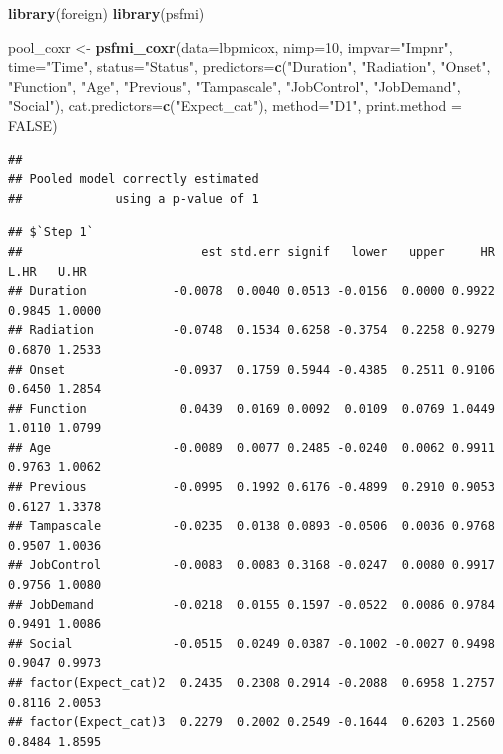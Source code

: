 \documentclass[
]{book}
\newenvironment{Shaded}{\begin{snugshade}}{\end{snugshade}}
\newcommand{\DataTypeTok}[1]{\textcolor[rgb]{0.13,0.29,0.53}{#1}}
\newcommand{\DecValTok}[1]{\textcolor[rgb]{0.00,0.00,0.81}{#1}}
\newcommand{\KeywordTok}[1]{\textcolor[rgb]{0.13,0.29,0.53}{\textbf{#1}}}
\newcommand{\NormalTok}[1]{#1}
\newcommand{\OperatorTok}[1]{\textcolor[rgb]{0.81,0.36,0.00}{\textbf{#1}}}
\newcommand{\OtherTok}[1]{\textcolor[rgb]{0.56,0.35,0.01}{#1}}
\newcommand{\StringTok}[1]{\textcolor[rgb]{0.31,0.60,0.02}{#1}}
\begin{document}
\begin{Shaded}
\begin{Highlighting}[]
\KeywordTok{library}\NormalTok{(foreign)}
\KeywordTok{library}\NormalTok{(psfmi)}

\NormalTok{pool_coxr <-}\StringTok{ }\KeywordTok{psfmi_coxr}\NormalTok{(}\DataTypeTok{data=}\NormalTok{lbpmicox, }\DataTypeTok{nimp=}\DecValTok{10}\NormalTok{, }\DataTypeTok{impvar=}\StringTok{"Impnr"}\NormalTok{, }\DataTypeTok{time=}\StringTok{"Time"}\NormalTok{, }\DataTypeTok{status=}\StringTok{"Status"}\NormalTok{,}
  \DataTypeTok{predictors=}\KeywordTok{c}\NormalTok{(}\StringTok{"Duration"}\NormalTok{, }\StringTok{"Radiation"}\NormalTok{, }\StringTok{"Onset"}\NormalTok{, }\StringTok{"Function"}\NormalTok{, }\StringTok{"Age"}\NormalTok{,}
  \StringTok{"Previous"}\NormalTok{, }\StringTok{"Tampascale"}\NormalTok{, }\StringTok{"JobControl"}\NormalTok{, }\StringTok{"JobDemand"}\NormalTok{, }\StringTok{"Social"}\NormalTok{), }
  \DataTypeTok{cat.predictors=}\KeywordTok{c}\NormalTok{(}\StringTok{"Expect_cat"}\NormalTok{), }\DataTypeTok{method=}\StringTok{"D1"}\NormalTok{, }\DataTypeTok{print.method =} \OtherTok{FALSE}\NormalTok{)}
\end{Highlighting}
\end{Shaded}

\begin{verbatim}
## 
## Pooled model correctly estimated
##             using a p-value of 1
\end{verbatim}

\begin{Shaded}
\end{Shaded}

\begin{verbatim}
## $`Step 1`
##                         est std.err signif   lower   upper     HR   L.HR   U.HR
## Duration            -0.0078  0.0040 0.0513 -0.0156  0.0000 0.9922 0.9845 1.0000
## Radiation           -0.0748  0.1534 0.6258 -0.3754  0.2258 0.9279 0.6870 1.2533
## Onset               -0.0937  0.1759 0.5944 -0.4385  0.2511 0.9106 0.6450 1.2854
## Function             0.0439  0.0169 0.0092  0.0109  0.0769 1.0449 1.0110 1.0799
## Age                 -0.0089  0.0077 0.2485 -0.0240  0.0062 0.9911 0.9763 1.0062
## Previous            -0.0995  0.1992 0.6176 -0.4899  0.2910 0.9053 0.6127 1.3378
## Tampascale          -0.0235  0.0138 0.0893 -0.0506  0.0036 0.9768 0.9507 1.0036
## JobControl          -0.0083  0.0083 0.3168 -0.0247  0.0080 0.9917 0.9756 1.0080
## JobDemand           -0.0218  0.0155 0.1597 -0.0522  0.0086 0.9784 0.9491 1.0086
## Social              -0.0515  0.0249 0.0387 -0.1002 -0.0027 0.9498 0.9047 0.9973
## factor(Expect_cat)2  0.2435  0.2308 0.2914 -0.2088  0.6958 1.2757 0.8116 2.0053
## factor(Expect_cat)3  0.2279  0.2002 0.2549 -0.1644  0.6203 1.2560 0.8484 1.8595
\end{verbatim}
\end{document}
